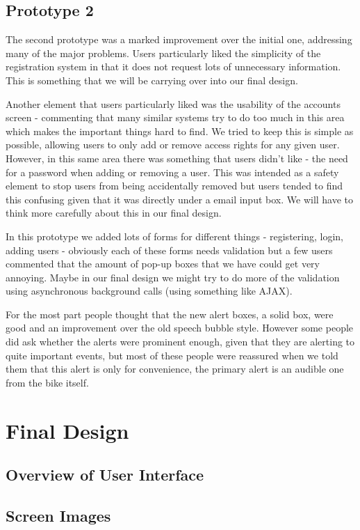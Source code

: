\documentclass[a4paper]{report}
\begin{document}
\section{Prototype 2}
The second prototype was a marked improvement over the initial one, addressing many of the major problems. Users particularly liked the simplicity of the registration system in that it does not request lots of unnecessary information. This is something that we will be carrying over into our final design. 

Another element that users particularly liked was the usability of the accounts screen - commenting that many similar systems try to do too much in this area which makes the important things hard to find. We tried to keep this is simple as possible, allowing users to only add or remove access rights for any given user. However, in this same area there was something that users didn't like - the need for a password when adding or removing a user. This was intended as a safety element to stop users from being accidentally removed but users tended to find this confusing given that it was directly under a email input box. We will have to think more carefully about this in our final design.  

In this prototype we added lots of forms for different things - registering, login, adding users - obviously each of these forms needs validation but a few users commented that the amount of pop-up boxes that we have could get very annoying. Maybe in our final design we might try to do more of the validation using asynchronous background calls (using something like AJAX).

For the most part people thought that the new alert boxes, a solid box, were good  and an improvement over the old speech bubble style. However some people did ask whether the alerts were prominent enough, given that they are alerting to quite important events, but most of these people were reassured when we told them that this alert is only for convenience, the primary alert is an audible one from the bike itself.
\chapter{Final Design}
\section{Overview of User Interface}
\section{Screen Images}
\end{document}
